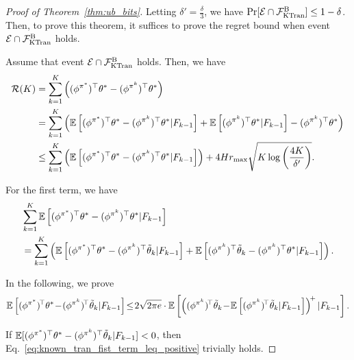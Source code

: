 \begin{proof}[Proof of Theorem~\ref{thm:ub_bits}]
	Letting $\delta'=\frac{\delta}{3}$, we have $\Pr[\mathcal{E} \cap \mathcal{F}^{\textup{B}}_{\textup{KTran}}] \leq 1-\delta$. Then, to prove this theorem, it suffices to prove
	the regret bound when event $\mathcal{E} \cap \mathcal{F}^{\textup{B}}_{\textup{KTran}}$ holds.
	
	Assume that event $\mathcal{E} \cap \mathcal{F}^{\textup{B}}_{\textup{KTran}}$ holds. Then, we have
	\begin{align}
		\mathcal{R}(K) &= \sum_{k=1}^{K} \left(  (\phi^{\pi^*})^\top \theta^* - (\phi^{\pi^k})^\top \theta^*  \right)
		\nonumber\\
		&= \sum_{k=1}^{K} \left(  \mathbb{E}\left[  (\phi^{\pi^*})^\top \theta^* - (\phi^{\pi^k})^\top \theta^* | F_{k-1}  \right] + \mathbb{E}\left[  (\phi^{\pi^k})^\top \theta^* | F_{k-1}  \right] - (\phi^{\pi^k})^\top \theta^*  \right) 
		\nonumber\\
		&\leq \sum_{k=1}^{K} \left(  \mathbb{E}\left[  (\phi^{\pi^*})^\top \theta^* - (\phi^{\pi^k})^\top \theta^* | F_{k-1}  \right]  \right) + 4 H r_{\max} \sqrt{ K \log\left( \frac{4K}{\delta'} \right) } . \label{eq:known_tran_regret_decomposition}
	\end{align}
	
	
	For the first term, we have
	\begin{align}
		&\sum_{k=1}^{K} \mathbb{E}\left[  (\phi^{\pi^*})^\top \theta^* - (\phi^{\pi^k})^\top \theta^* | F_{k-1}  \right] \nonumber\\
		&= \sum_{k=1}^{K} \left(  \mathbb{E}\left[  (\phi^{\pi^*})^\top \theta^* - (\phi^{\pi^k})^\top \tilde{\theta}_k | F_{k-1}  \right] + \mathbb{E}\left[  (\phi^{\pi^k})^\top \tilde{\theta}_k - (\phi^{\pi^k})^\top \theta^* | F_{k-1}  \right]  \right) . \label{eq:known_tran_ex_phi_star-phi_pi_k_theta}
	\end{align}
	
	In the following, we prove
	\begin{align}
		\ex\mbr{ (\phi^{\pi^*})^{\!\top} \theta^* \!-\! (\phi^{\pi^k})^{\!\top} \tilde{\theta}_k | F_{k-1} } \!\leq\! 2\sqrt{2\pi e} \cdot \ex\mbr{ \sbr{ (\phi^{\pi^k})^{\!\top} \tilde{\theta}_k  \!-\! \ex\mbr{ (\phi^{\pi^k})^{\!\top} \tilde{\theta}_k  | F_{k-1} } }^{\!+} | F_{k-1} } . \label{eq:known_tran_fist_term_leq_positive}
	\end{align}
	
	If $\mathbb{E}[ (\phi^{\pi^*})^\top \theta^* - (\phi^{\pi^k})^\top \tilde{\theta}_k | F_{k-1} ]<0$, then Eq.~\eqref{eq:known_tran_fist_term_leq_positive} trivially holds. 
	

\end{proof}
